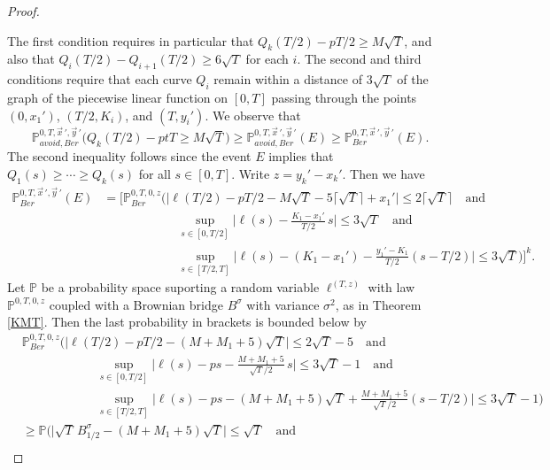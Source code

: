 \begin{proof}
\begin{enumerate}[label=(\arabic*)]
	\end{enumerate}
	The first condition requires in particular that $Q_k(T/2)-pT/2 \geq M\sqrt{T}$, and also that $Q_i(T/2)-Q_{i+1}(T/2)\geq 6\sqrt{T}$ for each $i$. The second and third conditions require that each curve $Q_i$ remain within a distance of $3\sqrt{T}$ of the graph of the piecewise linear function on $[0,T]$ passing through the points $(0,x_1')$, $(T/2,K_i)$, and $(T,y_i')$. We observe that
	\[
	\mathbb{P}^{0,T,\vec{x}\,',\vec{y}\,'}_{avoid, Ber} \Big(Q_k(T/2) - ptT \geq M\sqrt{T}\Big) \geq \mathbb{P}^{0,T,\vec{x}\,',\vec{y}\,'}_{avoid, Ber}(E) \geq \mathbb{P}^{0,T,\vec{x}\,',\vec{y}\,'}_{Ber}(E).
	\]
	The second inequality follows since the event $E$ implies that $Q_1(s)\geq\cdots\geq Q_k(s)$ for all $s\in[0,T]$. Write $z=y_k'-x_k'$. Then we have
	\begin{equation}\label{19gibbs}
	\begin{split}
	\mathbb{P}^{0,T,\vec{x}\,',\vec{y}\,'}_{Ber}(E) &= \Big[\mathbb{P}^{0,T,0,z}_{Ber}\Big(\big|\ell(T/2)-pT/2-M\sqrt{T}-5\lceil\sqrt{T}\rceil+x_1'\big|\leq 2\lceil\sqrt{T}\rceil \quad\mathrm{and}\\
	&\qquad\qquad\qquad \sup_{s\in[0,T/2]}\Big|\ell(s) - \frac{K_1-x_1'}{T/2}\,s\Big| \leq 3\sqrt{T}\quad\mathrm{and}\\
	&\qquad\qquad\qquad \sup_{s\in[T/2,T]}\Big|\ell(s)-(K_1-x_1')-\frac{y_1'-K_1}{T/2}(s-T/2)\Big| \leq 3\sqrt{T}\Big) \Big]^k.
	\end{split}
	\end{equation}
	Let $\mathbb{P}$ be a probability space suporting a random variable $\ell^{(T,z)}$ with law $\mathbb{P}^{0,T,0,z}$ coupled with a Brownian bridge $B^\sigma$ with variance $\sigma^2$, as in Theorem \ref{KMT}. Then the last probability in brackets is bounded below by
	\begin{equation}\label{19BB}
	\begin{split}
	& \mathbb{P}^{0,T,0,z}_{Ber}\Big(\big|\ell(T/2)-pT/2-(M+M_1+5)\sqrt{T}\big|\leq 2\sqrt{T} - 5\quad\mathrm{and}\\
	&\qquad\qquad\qquad \sup_{s\in[0,T/2]}\Big|\ell(s)-ps-\frac{M+M_1+5}{\sqrt{T}/2}\,s\Big| \leq 3\sqrt{T} - 1 \quad\mathrm{and}\\
	&\qquad\qquad\qquad \sup_{s\in[T/2,T]}\Big|\ell(s)-ps-(M+M_1+5)\sqrt{T}+\frac{M+M_1+5}{\sqrt{T}/2}(s-T/2)\Big| \leq 3\sqrt{T} - 1 \Big)\\
	&\geq \mathbb{P}\Big(\big|\sqrt{T}\,B^\sigma_{1/2} - (M+M_1+5)\sqrt{T}\big|\leq \sqrt{T} \quad\mathrm{and}\\

\end{split}
\end{equation}
\end{proof}
